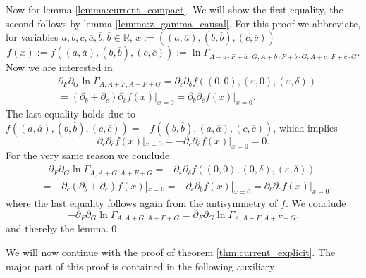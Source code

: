 \documentclass[oneside,reqno,12pt]{amsart}
\begin{document}
Now for lemma \ref{lemma:current_compact}. We will show the first equality, the second follows by lemma \ref{lemma:z_gamma_causal}. For this proof we abbreviate, for variables \(a,b,c,\overline{a},\overline{b},\overline{b}\in \mathbb{R}\), \(x:=((a,\overline{a}),(b,\overline{b}),(c,\overline{c}))\)
\begin{equation}
f(x):=f((a,\overline{a}),(b,\overline{b}),(c,\overline{c})):=\ln \Gamma_{A+a\cdot F+\overline{a}\cdot G,A+b\cdot F+\overline{b}\cdot G,A+c\cdot F+\overline{c} \cdot G}.
\end{equation}
Now we are interested in 
\begin{align}\tag*{}
&\partial_F\partial_G\ln \Gamma_{A,A+F,A+F+G} 
= \partial_\varepsilon \partial_\delta f((0,0),(\varepsilon,0),(\varepsilon,\delta))\\ \label{current_compact_first_half}
& = (\partial_b + \partial_c)\partial_{\overline{c}} \left.f(x)\right|_{x=0}
 =\partial_b \partial_{\overline{c}} \left. f(x)\right|_{x=0}.
\end{align}
The last equality holds due to \(f((a,\overline{a}),(b,\overline{b}),(c,\overline{c}))=-f((b,\overline{b}),(a,\overline{a}),(c,\overline{c}))\), which implies
\begin{equation}
\partial_c \partial_{\overline{c}} f(x)|_{x=0}=-\partial_c \partial_{\overline{c}} f(x)|_{x=0}=0.
\end{equation}
For the very same reason we conclude
\begin{align*}
&-\partial_F \partial_G \ln \Gamma_{A,A+G,A+F+G} 
= - \partial_\varepsilon \partial_\delta f((0,0),(0,\delta),(\varepsilon,\delta))\\
&= - \partial_c (\partial_{\overline{b}} + \partial_{\overline{c}}) f(x)|_{x=0}
= - \partial_c \partial_{\overline{b}} f(x)|_{x=0}
= \partial_b \partial_{\overline{c}} f(x)|_{x=0},
\end{align*}
where the last equality follows again from the antisymmetry of \(f\). We conclude
\begin{equation}
-\partial_F \partial_G \ln \Gamma_{A,A+G,A+F+G} =\partial_F\partial_G\ln \Gamma_{A,A+F,A+F+G} .
\end{equation}
and thereby the lemma.\qed

We will now continue with the proof of theorem \ref{thm:current_explicit}. The major part of this proof is contained in the following auxiliary
\end{document}
